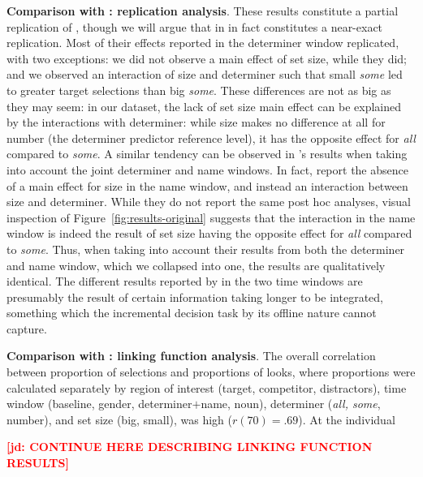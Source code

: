\documentclass[10pt,letterpaper]{article}
\newcommand{\figref}[1]{Figure~\ref{#1}}
\newcommand{\jd}[1]{\textcolor{Red}{\textbf{[jd: #1]}}}
\begin{document}
\textbf{Comparison with : replication analysis}. These results constitute a partial replication of  , though we will argue that in in fact constitutes a near-exact replication. Most of their effects reported in the determiner window replicated, with two exceptions: we did not observe a main effect of set size, while they did; and we observed an interaction of size and determiner such that small \emph{some} led to greater target selections than big \emph{some}. These differences are not as big as they may seem: in our dataset, the lack of set size main effect can be explained by the interactions with determiner: while size makes no difference at all for number (the determiner predictor reference level), it has the opposite effect for \emph{all} compared to \emph{some}. A similar tendency can be observed in  's results when taking into account the joint determiner and name windows. In fact,   report the absence of a main effect for size in the name window, and instead an interaction between size and determiner. While they do not report the same post hoc analyses, visual inspection of \figref{fig:results-original} suggests that the interaction in the name window is indeed the result of set size having the opposite effect for \emph{all} compared to \emph{some}. Thus, when taking into account their results from both the determiner and name window, which we collapsed into one, the results are qualitatively identical. The different results reported by   in the two time windows are presumably the result of certain information taking longer to be integrated, something which the incremental decision task by its offline nature cannot capture.

\textbf{Comparison with : linking function analysis}. The overall correlation between proportion of selections and proportions of looks, where proportions were calculated separately by region of interest (target, competitor, distractors), time window (baseline, gender, determiner$+$name, noun), determiner (\emph{all, some}, number), and set size (big, small), was high ($r(70) = .69$). At the individual


\jd{CONTINUE HERE DESCRIBING LINKING FUNCTION RESULTS}
\end{document}
